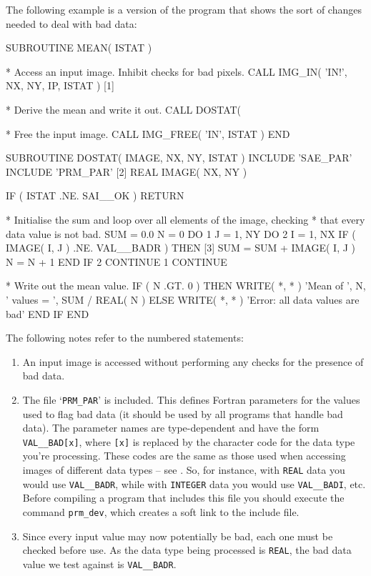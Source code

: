 \documentclass[twoside,11pt,nolof]{starlink}
\providecommand{\myverb}[1]{{\texttt{#1}}}
\providecommand{\mynote}{The following notes refer to the numbered statements:}
\newenvironment{code}{\begin{small}}
                     {\end{small}}
\newenvironment{enumnotes}
{
   \renewcommand{\labelenumi}{\myverb{[\theenumi]}}
   \begin{enumerate}
}{
   \end{enumerate}
   \renewcommand{\labelenumi}{\theenumi}
}
\begin{document}
The following example is a version of the
\htmlref{\myverb{mean.f}}{IMGMEAN} program  that shows the sort of changes needed to deal with
bad data:
\begin{code}
\begin{terminalv}
      SUBROUTINE MEAN( ISTAT )

*  Access an input image. Inhibit checks for bad pixels.
      CALL IMG_IN( 'IN!', NX, NY, IP, ISTAT )                 [1]

*  Derive the mean and write it out.
      CALL DOSTAT( %

*  Free the input image.
      CALL IMG_FREE( 'IN', ISTAT )
      END

      SUBROUTINE DOSTAT( IMAGE, NX, NY, ISTAT )
      INCLUDE 'SAE_PAR'
      INCLUDE 'PRM_PAR'                                       [2]
      REAL IMAGE( NX, NY )

      IF ( ISTAT .NE. SAI__OK ) RETURN

*  Initialise the sum and loop over all elements of the image, checking
*  that every data value is not bad.
      SUM = 0.0
      N = 0
      DO 1 J = 1, NY
         DO 2 I = 1, NX
            IF ( IMAGE( I, J ) .NE. VAL__BADR ) THEN          [3]
               SUM = SUM + IMAGE( I, J )
               N = N + 1
            END IF
 2       CONTINUE
 1    CONTINUE

*  Write out the mean value.
      IF ( N .GT. 0 ) THEN
         WRITE( *, * ) 'Mean of ', N, ' values = ', SUM / REAL( N )
      ELSE
         WRITE( *, * ) 'Error: all data values are bad'
      END IF
      END
\end{terminalv}
\end{code}
\mynote
\begin{enumnotes}
\item
An input image is accessed without performing any checks for the
presence of bad data.

\item
The file `\myverb{PRM\_PAR}' is included. This defines Fortran
parameters for the values used to flag bad data (it should be used by
all programs that handle bad data). The parameter names are
type-dependent and have the form \myverb{VAL\_\_BAD[x]}, where
\myverb{[x]} is replaced by the character code for the data type
you're processing. These codes are the same as those used when
accessing images of different data types -- see
.  So, for instance, with
\myverb{REAL} data you would use \myverb{VAL\_\_BADR}, while with
\myverb{INTEGER} data you would use \myverb{VAL\_\_BADI}, etc. Before
compiling a program that includes this file you should execute the
command \myverb{prm\_dev}, which creates a soft link to the include
file.

\item
Since every input value may now potentially be bad, each one must be
checked before use. As the data type being processed is \myverb{REAL},
the bad data value we test against is \myverb{VAL\_\_BADR}.
\end{enumnotes}
\end{document}
